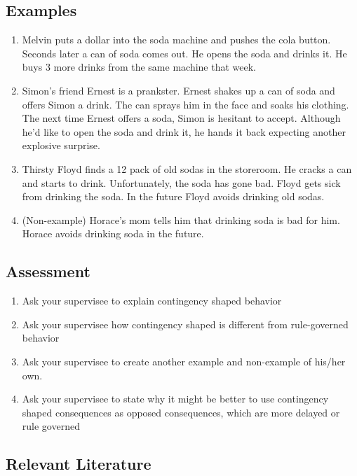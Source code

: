 \subsection{Examples}
\begin{enumerate}
\item Melvin puts a dollar into the soda machine and pushes the cola button. Seconds later a can of soda comes out. He opens the soda and drinks it.  He buys 3 more drinks from the same machine that week.
\item Simon's friend Ernest is a prankster.  Ernest shakes up a can of soda and offers Simon a drink.  The can sprays him in the face and soaks his clothing.  The next time Ernest offers a soda, Simon is hesitant to accept.  Although he'd like to open the soda and drink it, he hands it back expecting another explosive surprise.
\item Thirsty Floyd finds a 12 pack of old sodas in the storeroom.  He cracks a can and starts to drink. Unfortunately, the soda has gone bad. Floyd gets sick from drinking the soda. In the future Floyd avoids drinking old sodas.
\item (Non-example) Horace's mom tells him that drinking soda is bad for him. Horace avoids drinking soda in the future.
%
\end{enumerate}
%
\subsection{Assessment}
\begin{enumerate}
\item Ask your supervisee to explain contingency shaped behavior 
\item Ask your supervisee how contingency shaped is different from rule-governed behavior
\item Ask your supervisee to create another example and non-example of his/her own. 
\item Ask your supervisee to state why it might be better to use contingency shaped consequences as opposed consequences, which are more delayed or rule governed      
\end{enumerate}
%
\subsection{Relevant Literature}
\begin{refsection}
\nocite{cooper2007applied,
        malott2003principles,
        michael2004concepts}
\printbibliography[heading=none]
\end{refsection}
%
